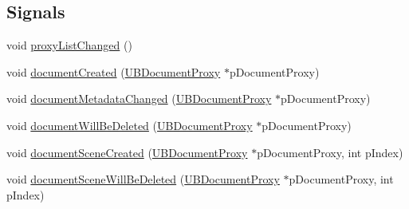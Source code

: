 \subsection*{Signals}
\begin{DoxyCompactItemize}
\item 
void \hyperlink{class_u_b_persistence_manager_a729bdda358bcfdffa6364d6081291c8b}{proxy\-List\-Changed} ()
\item 
void \hyperlink{class_u_b_persistence_manager_a8dd4370a27a8e122031ad9ca23722492}{document\-Created} (\hyperlink{class_u_b_document_proxy}{U\-B\-Document\-Proxy} $\ast$p\-Document\-Proxy)
\item 
void \hyperlink{class_u_b_persistence_manager_aa9c4499efd1d6a0b7efaf0aacb856a5c}{document\-Metadata\-Changed} (\hyperlink{class_u_b_document_proxy}{U\-B\-Document\-Proxy} $\ast$p\-Document\-Proxy)
\item 
void \hyperlink{class_u_b_persistence_manager_a59fea00197400c0b0855c06bdac1160b}{document\-Will\-Be\-Deleted} (\hyperlink{class_u_b_document_proxy}{U\-B\-Document\-Proxy} $\ast$p\-Document\-Proxy)
\item 
void \hyperlink{class_u_b_persistence_manager_a2d8a86cfd7b404f100326f6c6066f6d2}{document\-Scene\-Created} (\hyperlink{class_u_b_document_proxy}{U\-B\-Document\-Proxy} $\ast$p\-Document\-Proxy, int p\-Index)
\item 
void \hyperlink{class_u_b_persistence_manager_aa8d29f9972ca8d523ca994658c481923}{document\-Scene\-Will\-Be\-Deleted} (\hyperlink{class_u_b_document_proxy}{U\-B\-Document\-Proxy} $\ast$p\-Document\-Proxy, int p\-Index)
\end{DoxyCompactItemize}
